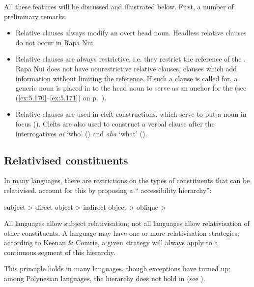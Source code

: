 All these features will be discussed and illustrated below. First, a number of preliminary remarks.

\begin{itemize}
\item 
Relative clauses always modify an overt head noun. Headless relative clauses do not occur in Rapa Nui.

\item 
Relative clauses are always restrictive, i.e. they restrict the reference of the . Rapa Nui does not have nonrestrictive relative clauses, clauses which add information without limiting the reference. If such a clause is called for, a generic noun is placed in  to the head noun to serve as an anchor for the  (see (\ref{ex:5.170}–\ref{ex:5.171}) on p.~\pageref{ex:5.170}).

\item 
Relative clauses are used in cleft constructions, which serve to put a noun in focus (). Clefts are also used to construct a verbal clause after the interrogatives \textit{ai} ‘who’ () and \textit{aha} ‘what’ ().

\end{itemize}
\subsection{Relativised constituents}\label{sec:11.4.2}

In many languages, there are restrictions on the types of constituents that can be relativised. \citet{KeenanComrie1977,KeenanComrie1979} account for this by proposing a “ accessibility hierarchy”: 

\ea\label{ex:11.88a}
\label{hierarchy}  subject {\textgreater} direct object {\textgreater} indirect object {\textgreater} oblique {\textgreater} 
\z

All languages allow subject relativisation; not all languages allow relativisation of other constituents. A language may have one or more relativisation strategies; according to Keenan \& Comrie, a given strategy will always apply to a continuous segment of this hierarchy. 

This principle holds in many languages, though exceptions have turned up; among Polynesian languages, the hierarchy does not hold in  (see \citealt{Harlow2007Maori}).

